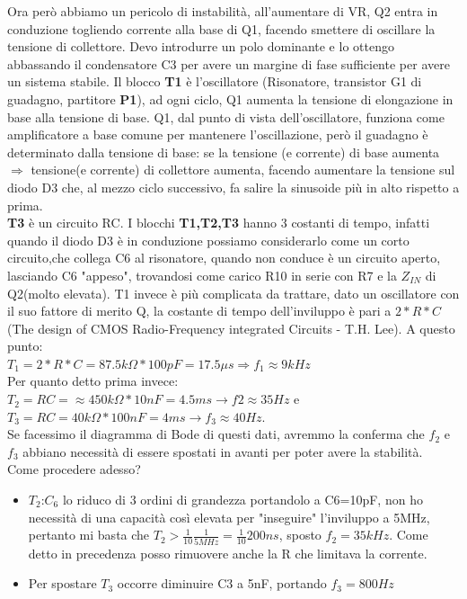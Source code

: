 \documentclass{article}
\begin{document}
Ora però abbiamo un pericolo di instabilità, all'aumentare di VR, Q2 entra in conduzione togliendo corrente alla base di Q1, facendo smettere di oscillare la tensione di collettore.
Devo introdurre un polo dominante e lo ottengo abbassando il condensatore C3 per avere un margine di fase sufficiente per avere un sistema stabile.
Il blocco \textbf{T1} è l'oscillatore (Risonatore, transistor G1 di guadagno, partitore \textbf{P1}), ad ogni ciclo, Q1 aumenta la tensione di elongazione in base alla tensione di base.
Q1, dal punto di vista dell'oscillatore, funziona come amplificatore a base comune per mantenere l'oscillazione, però il guadagno è determinato dalla tensione di base: se la tensione (e corrente) di base aumenta $\Rightarrow$ tensione(e corrente) di collettore aumenta, facendo aumentare la tensione sul diodo D3 che, al mezzo ciclo successivo, fa salire la sinusoide più in alto rispetto a prima.\\
\textbf{T3} è un circuito RC.
I blocchi \textbf{T1,T2,T3} hanno 3 costanti di tempo, infatti quando il diodo D3 è in conduzione possiamo considerarlo come un corto circuito,che collega C6 al risonatore, quando non conduce è un circuito aperto, lasciando C6 "appeso", trovandosi come carico R10 in serie con R7 e la $Z_{IN}$ di Q2(molto elevata).
T1 invece è più complicata da trattare, dato un oscillatore con il suo fattore di merito Q, la costante di tempo dell'inviluppo è pari a $2*R*C$ (The design of CMOS Radio-Frequency integrated Circuits - T.H. Lee).
A questo punto:\\ $T_1=2*R*C=87.5k\Omega *100pF=17.5\mu s \Rightarrow f_1\approx 9kHz$\\
Per quanto detto prima invece:\\ $T_2=RC=\approx 450k\Omega *10nF=4.5ms \rightarrow f2\approx 35Hz$ e\\ $T_3=RC=40k\Omega *100nF=4ms \rightarrow f_3\approx 40Hz$.\\
Se facessimo il diagramma di Bode di questi dati, avremmo la conferma che $f_2$ e  $f_3$ abbiano necessità di essere spostati in avanti per poter avere la stabilità.\\Come procedere adesso?\\
\begin{itemize}
\item $T_2$:$C_6$ lo riduco di 3 ordini di grandezza portandolo a C6=10pF, non ho necessità di una capacità così elevata per "inseguire" l'inviluppo a 5MHz, pertanto mi basta che \Large $T_2>\frac{1}{10}\frac{1}{5MHz}=\frac{1}{10}200ns$\normalsize, sposto $f_2=35kHz$.
Come detto in precedenza posso rimuovere anche la R che limitava la corrente.
\item Per spostare $T_3$ occorre diminuire C3 a 5nF, portando $f_3=800Hz$
\end{itemize}
\end{document}
